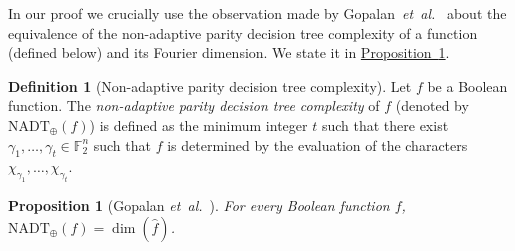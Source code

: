 \documentclass[11pt]{article}
\numberwithin{equation}{section}
\newtheorem{proposition}[theorem]{Proposition}
\theoremstyle{definition}
\newtheorem{definition}[theorem]{Definition}
\theoremstyle{plain}
\newcommand{\expref}[2]{\hyperref[#2]{#1~\ref{#2}}}
\DeclareMathOperator{\Supp}{supp}
\DeclareMathOperator{\dimn}{dim}
\newcommand{\etal}{{\it et~al.}}
\begin{document}
In our proof we crucially use the observation made by Gopalan~\etal~\cite{DBLP:journals/siamcomp/GopalanOSSW11} about the equivalence of the non-adaptive parity decision tree complexity of a function (defined below) and its Fourier dimension. We state it in \expref{Proposition}{prop:basic}.
\begin{definition}[Non-adaptive parity decision tree complexity]
Let $f$ be a Boolean function. The \emph{non-adaptive parity decision
  tree complexity} of $f$ (denoted by $\text{NADT}_\oplus(f)$) is defined as the minimum integer $t$ such that there
exist $\gamma_1, \ldots, \gamma_t \in \mathbb{F}_2^n$ such that $f$ is determined by the evaluation of the characters $\chi_{\gamma_1}, \ldots, \chi_{\gamma_t}$.
\end{definition}
\begin{proposition}[Gopalan \etal~\cite{DBLP:journals/siamcomp/GopalanOSSW11}]
\label{prop:basic}
 For every Boolean function $f$, $\mbox{NADT}_\oplus(f) = \dimn(\widehat{f})$.
\end{proposition}

%
%
\end{document}
